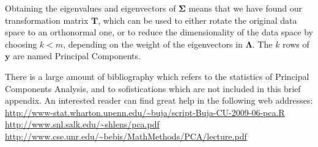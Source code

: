 Obtaining the eigenvalues and eigenvectors of $\mathbf{\Sigma}$ means
that we have found our transformation matrix $\mathbf{T}$, which can
be used to either rotate the original data space to an orthonormal
one, or to reduce the dimensionality of the data space by choosing
$k<m$, depending on the weight of the eigenvectors in
$\mathbf{\Lambda}$. The $k$ rows of $\mathbf{y}$ are named Principal
Components.

There is a large amount of bibliography which refers to the statistics
of Principal Components Analysis, and to sofistications which are not
included in this brief appendix. An interested reader can find great
help in the following web addresses:\\
\url{http://www-stat.wharton.upenn.edu/~buja/script-Buja-CU-2009-06-pca.R}\\
\url{http://www.snl.salk.edu/~shlens/pca.pdf}\\
\url{http://www.cse.unr.edu/~bebis/MathMethods/PCA/lecture.pdf}




